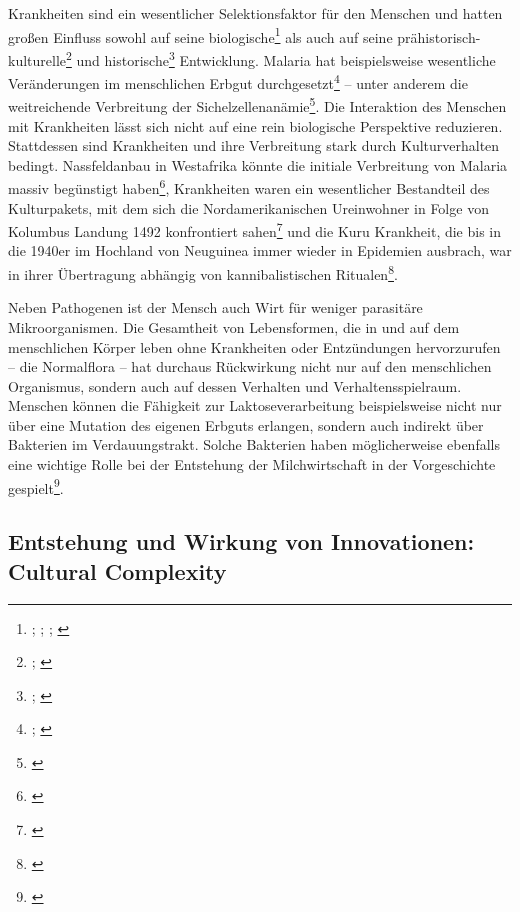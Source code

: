 \documentclass[openany,twoside,twocolumn]{book}
\let\rmarkdownfootnote\footnote%
\def\footnote{\protect\rmarkdownfootnote}
\begin{document}
Krankheiten sind ein wesentlicher Selektionsfaktor für den Menschen und
hatten großen Einfluss sowohl auf seine biologische\footnote{\textcite{bustamante_natural_2005};
  \textcite{enard_viruses_2016}; \textcite{mead_balancing_2003};
  \textcite{sabeti_genome-wide_2007}} als auch auf seine
prähistorisch-kulturelle\footnote{\textcite{martin_health_2002};
  \textcite{oxenham_skeletal_2005}} und historische\footnote{\textcite{alfani_plague_2013};
  \textcite{murray_estimation_2006}} Entwicklung. Malaria hat
beispielsweise wesentliche Veränderungen im menschlichen Erbgut
durchgesetzt\footnote{\textcite{kwiatkowski_how_2005};
  \textcite{tishkoff_haplotype_2001}} -- unter anderem die weitreichende
Verbreitung der Sichelzellenanämie\footnote{\textcite{allison_protection_1954}}.
Die Interaktion des Menschen mit Krankheiten lässt sich nicht auf eine
rein biologische Perspektive reduzieren. Stattdessen sind Krankheiten
und ihre Verbreitung stark durch Kulturverhalten bedingt. Nassfeldanbau
in Westafrika könnte die initiale Verbreitung von Malaria massiv
begünstigt haben\footnote{\textcite{durham_coevolution_1991-1}},
Krankheiten waren ein wesentlicher Bestandteil des Kulturpakets, mit dem
sich die Nordamerikanischen Ureinwohner in Folge von Kolumbus Landung
1492 konfrontiert sahen\footnote{\textcite{nunn_columbian_2010}} und die
Kuru Krankheit, die bis in die 1940er im Hochland von Neuguinea immer
wieder in Epidemien ausbrach, war in ihrer Übertragung abhängig von
kannibalistischen Ritualen\footnote{\textcite{lindenbaum_kuru_2015}}.

Neben Pathogenen ist der Mensch auch Wirt für weniger parasitäre
Mikroorganismen. Die Gesamtheit von Lebensformen, die in und auf dem
menschlichen Körper leben ohne Krankheiten oder Entzündungen
hervorzurufen -- die Normalflora -- hat durchaus Rückwirkung nicht nur
auf den menschlichen Organismus, sondern auch auf dessen Verhalten und
Verhaltensspielraum. Menschen können die Fähigkeit zur
Laktoseverarbeitung beispielsweise nicht nur über eine Mutation des
eigenen Erbguts erlangen, sondern auch indirekt über Bakterien im
Verdauungstrakt. Solche Bakterien haben möglicherweise ebenfalls eine
wichtige Rolle bei der Entstehung der Milchwirtschaft in der
Vorgeschichte gespielt\footnote{\textcite{walter_human_2011}}.

\hypertarget{entstehung-und-wirkung-von-innovationen-cultural-complexity}{%
\subsection{Entstehung und Wirkung von Innovationen: Cultural
Complexity}\label{entstehung-und-wirkung-von-innovationen-cultural-complexity}}
\end{document}
